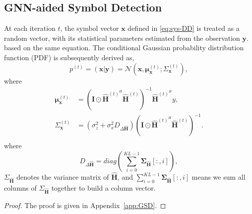\documentclass[journal]{IEEEtran}
\begin{document}
\subsection{GNN-aided Symbol Detection}
At each iteration $t$, the symbol vector $\bm{x}$ defined in \eqref{eq:sys-DD} is treated as a random vector, with its statistical parameters estimated from the observation $\bm{y}$. based on the same equation. The conditional Gaussian probability distribution
function (PDF) is subsequently derived as,
\begin{equation}
p^{(t)}=(\bm{x}|\bm{y}) = \mathcal{N}(\bm{x}, \bm{\mu}_{\bm{x}}^{(t)}; \Sigma_{\bm{x}}^{(t)}),
\end{equation}
where
\begin{subequations}
\begin{align}
\bm{\mu}_{\bm{x}}^{(t)} &= (\bm I\odot\hat{\bm H}^{(t)^H} \hat{\bm H}^{(t)})^{-1}\hat{\bm H}^{(t)^H}y, \label{eq:GSD-mean} \\
\Sigma_{\bm{x}}^{(t)} &= (\sigma_z^2 + \sigma_x^2 D_{\Delta \hat{\bm H}})(\bm I\odot\hat{\bm H}^{(t)^H} \hat{\bm H}^{(t)})^{-1}. \label{eq:GSD-cov} \\
\end{align}
\end{subequations}
where
\begin{equation}
D_{\Delta \hat{\bm H}} = diag(\sum_{i=0}^{KL-1}\bm \Sigma_{\hat{\bm H}}[:, i]),
\end{equation}
$\Sigma_{\hat{\bm H}}$ denotes the variance matrix of $\hat{\bm H}$, and $\sum_{i=0}^{KL-1}\bm \Sigma_{\hat{\bm H}}[:, i]$ means we sum all columns of $\Sigma_{\hat{\bm H}}$ together to build a column vector.

\begin{proof}
The proof is given in Appendix~\ref{app:GSD}.
\end{proof}

\end{document}
